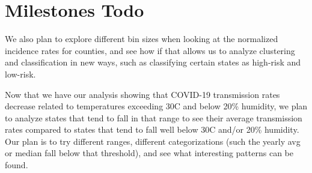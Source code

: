 \documentclass[sigconf,screen,nonacm]{acmart}
\begin{document}
\section{Milestones Todo}
We also plan to explore different bin sizes when looking at the normalized incidence rates for counties, and see how if that allows us to analyze clustering and classification in new ways, such as classifying certain states as high-risk and low-risk.

Now that we have our analysis showing that COVID-19 transmission rates decrease related to temperatures exceeding 30\textdegree{}C and below 20\% humidity, we plan to analyze states that tend to fall in that range to see their average transmission rates compared to states that tend to fall well below 30\textdegree{}C and/or 20\% humidity. Our plan is to try different ranges, different categorizations (such the yearly avg or median fall below that threshold), and see what interesting patterns can be found.











\end{document}
